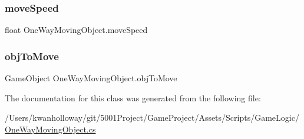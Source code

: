 \mbox{\label{class_one_way_moving_object_a57d03a6a88136b9c0a2fb931d3753fbd}} 
\subsubsection{\texorpdfstring{move\+Speed}{moveSpeed}}
{\footnotesize\ttfamily float One\+Way\+Moving\+Object.\+move\+Speed}

\mbox{\label{class_one_way_moving_object_a738199df4fd9102323b3031b91f27cee}} 
\subsubsection{\texorpdfstring{obj\+To\+Move}{objToMove}}
{\footnotesize\ttfamily Game\+Object One\+Way\+Moving\+Object.\+obj\+To\+Move}



The documentation for this class was generated from the following file\+:\begin{DoxyCompactItemize}
\item 
/\+Users/kwanholloway/git/5001\+Project/\+Game\+Project/\+Assets/\+Scripts/\+Game\+Logic/\hyperlink{_one_way_moving_object_8cs}{One\+Way\+Moving\+Object.\+cs}\end{DoxyCompactItemize}
